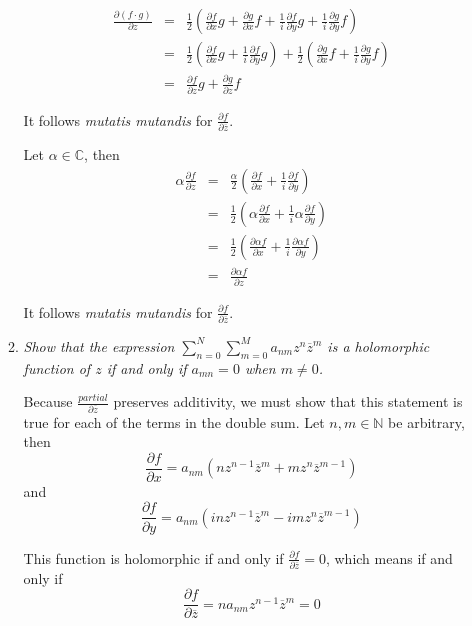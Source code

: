 \documentclass[letterpaper, 11pt]{article}
\begin{document}
\begin{enumerate}
\begin{enumerate}
\begin{eqnarray*}
\frac{\partial (f\cdot g)}{\partial z} &=& \frac{1}{2}\left(\frac{\partial f}{\partial x}g + \frac{\partial g}{\partial x}f + \frac{1}{i}\frac{\partial f}{\partial y}g + \frac{1}{i}\frac{\partial g}{\partial y}f\right) \\
&=& \frac{1}{2}\left(\frac{\partial f}{\partial x}g + \frac{1}{i}\frac{\partial f}{\partial y}g\right) + \frac{1}{2}\left(\frac{\partial g}{\partial x}f  + \frac{1}{i}\frac{\partial g}{\partial y}f\right) \\
&=& \frac{\partial f}{\partial z}g + \frac{\partial g}{\partial z}f
\end{eqnarray*}

It follows \emph{mutatis mutandis} for $\frac{\partial f}{\partial \overline{z}}$.

Let $\alpha \in \mathbb{C}$, then
\begin{eqnarray*}
\alpha \frac{\partial f}{\partial z} &=& \frac{\alpha}{2}\left( \frac{\partial f}{\partial x} + \frac{1}{i} \frac{\partial f}{\partial y} \right) \\
&=& \frac{1}{2}\left( \alpha\frac{\partial f}{\partial x} + \frac{1}{i} \alpha \frac{\partial f}{\partial y} \right) \\
&=& \frac{1}{2}\left( \frac{\partial \alpha f}{\partial x} + \frac{1}{i} \frac{\partial \alpha f}{\partial y} \right) \\
&=& \frac{\partial \alpha f}{\partial z}
\end{eqnarray*}

It follows \emph{mutatis mutandis} for $\frac{\partial f}{\partial \overline{z}}$.

\item \emph{Show that the expression $\sum_{n=0}^N\sum_{m=0}^M a_{nm} z^n \overline{z}^m$ is a holomorphic function of $z$ if and only if $a_{mn} = 0$ when $m \neq 0$.}

Because $\frac{partial}{\partial \overline{z}}$ preserves additivity, we must show that this statement is true for each of the terms in the double sum.  Let $n, m \in \mathbb{N}$ be arbitrary, then
\[
\frac{\partial f}{\partial x} = a_{nm}(nz^{n-1}\overline{z}^m + mz^n\overline{z}^{m-1})
\]
and
\[
\frac{\partial f}{\partial y} = a_{nm}(inz^{n-1}\overline{z}^m - imz^n\overline{z}^{m-1})
\]

This function is holomorphic if and only if $\frac{\partial f}{\partial \overline{z}} = 0$, which means if and only if
\[
\frac{\partial f}{\partial \overline{z}} = na_{nm}z^{n-1}\overline{z}^m = 0
\]


\end{enumerate}
\end{enumerate}
\end{document}
